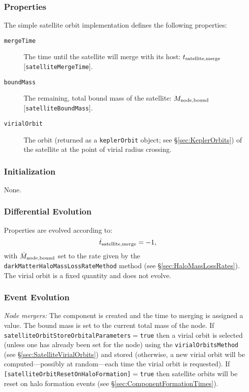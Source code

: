 \subsubsection{Properties}

The simple satellite orbit implementation defines the following properties:
\begin{description}
 \item [{\tt mergeTime}] The time until the satellite will merge with its host: $t_{\rm satellite, merge}$ [{\tt satelliteMergeTime}].
 \item [{\tt boundMass}] The remaining, total bound mass of the satellite: $M_{\rm node,bound}$ [{\tt satelliteBoundMass}].
 \item[{\tt virialOrbit}] The orbit (returned as a {\tt keplerOrbit} object; see \S\ref{sec:KeplerOrbits}) of the satellite at the point of virial radius crossing.
\end{description}

\subsubsection{Initialization}

None.

\subsubsection{Differential Evolution}

Properties are evolved according to:
\begin{equation}
 \dot{t}_{\rm satellite, merge} = -1,
\end{equation}
with $\dot{M}_{\rm node,bound}$ set to the rate given by the {\tt darkMatterHaloMassLossRateMethod} method (see \S\ref{sec:HaloMassLossRates}). The virial orbit is a fixed quantity and does not evolve.

\subsubsection{Event Evolution}

\noindent\emph{Node mergers:} The \gls{component} is created and the time to merging is assigned a value. The bound mass is set to the current total mass of the node. If {\tt satelliteOrbitStoreOrbitalParameters}$=${\tt true} then a virial orbit is selected (unless one has already been set for the node) using the {\tt virialOrbitsMethod} (see \S\ref{sec:SatelliteVirialOrbits}) and stored (otherwise, a new virial orbit will be computed---possibly at random---each time the virial orbit is requested). If {\tt [satelliteOrbitResetOnHaloFormation]}$=${\tt true} then satellite orbits will be reset on halo formation events (see \S\ref{sec:ComponentFormationTimes}).\\

